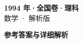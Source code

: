 \documentclass[zihao=-4, a4paper]{ctexart}
\begin{document}
\begin{center}
  {\Large\bfseries 1994 年·全国卷·理科}\\[4pt]
  {\large 数学 · 解析版}
\end{center}
\medskip
{}

\clearpage
{}
\begin{center}{\Large\bfseries 参考答案与详细解析}\end{center}
\medskip

\end{document}
